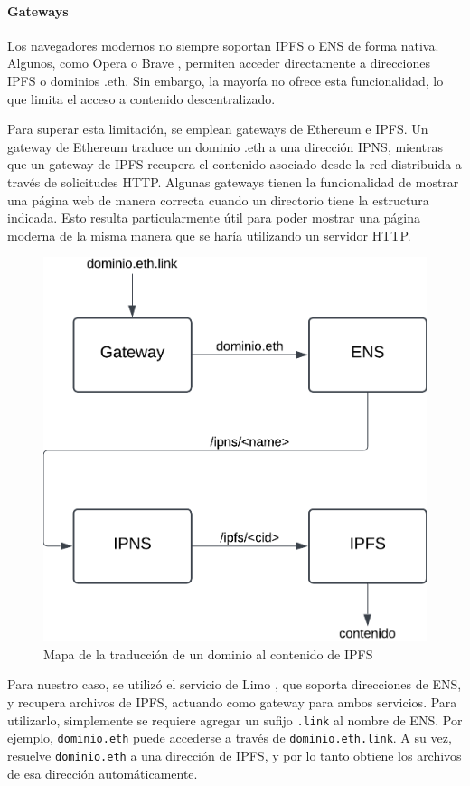\paragraph{Gateways} Los navegadores modernos no siempre soportan IPFS o ENS de forma nativa. Algunos, como Opera \cite{opera-ipfs} o Brave \cite{brave-ipfs}, permiten acceder directamente a direcciones IPFS o dominios .eth. Sin embargo, la mayoría no ofrece esta funcionalidad, lo que limita el acceso a contenido descentralizado.

Para superar esta limitación, se emplean gateways de Ethereum e IPFS. Un gateway de Ethereum traduce un dominio .eth a una dirección IPNS, mientras que un gateway de IPFS recupera el contenido asociado desde la red distribuida a través de solicitudes HTTP. Algunas gateways tienen la funcionalidad de mostrar una página web de manera correcta cuando un directorio tiene la estructura indicada. Esto resulta particularmente útil para poder mostrar una página moderna de la misma manera que se haría utilizando un servidor HTTP.

\begin{figure}[H]
    \centering
    \includegraphics[width=0.5\linewidth]{img/solucion-ipfs/traduccion-dominio.png}
    \caption{Mapa de la traducción de un dominio al contenido de IPFS}
    \label{fig:traduccion-ipfs}
\end{figure}

Para nuestro caso, se utilizó el servicio de Limo \cite{limo}, que soporta direcciones de ENS, y recupera archivos de IPFS, actuando como gateway para ambos servicios. Para utilizarlo, simplemente se requiere agregar un sufijo \texttt{.link} al nombre de ENS. Por ejemplo, \texttt{dominio.eth} puede accederse a través de \texttt{dominio.eth.link}. A su vez, resuelve \texttt{dominio.eth} a una dirección de IPFS, y por lo tanto obtiene los archivos de esa dirección automáticamente.

